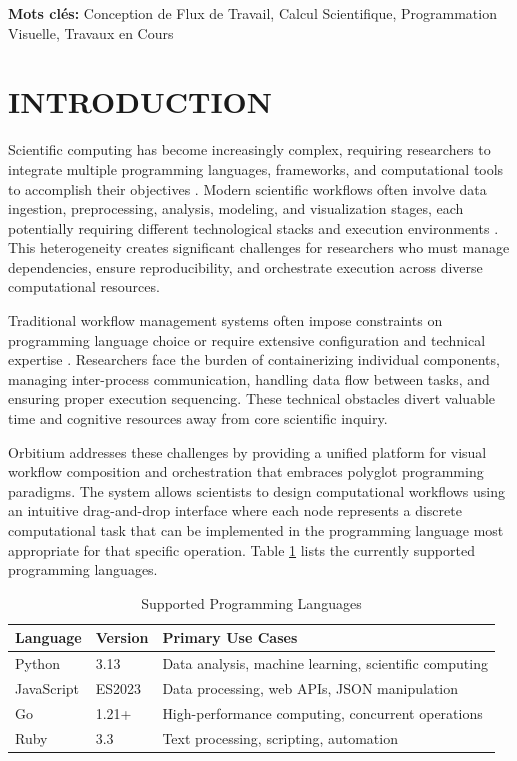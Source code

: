 \documentclass[12pt]{article}
\begin{document}
\vspace{1cm}

\noindent
\textbf{Mots clés:} Conception de Flux de Travail, Calcul Scientifique, Programmation Visuelle, Travaux en Cours

\newpage
\section{INTRODUCTION}

\hspace{\parindent}Scientific computing has become increasingly complex, requiring researchers to integrate multiple programming languages, frameworks, and computational tools to accomplish their objectives \cite{cohen2020scientific}. Modern scientific workflows often involve data ingestion, preprocessing, analysis, modeling, and visualization stages, each potentially requiring different technological stacks and execution environments \cite{deelman2015future}. This heterogeneity creates significant challenges for researchers who must manage dependencies, ensure reproducibility, and orchestrate execution across diverse computational resources.

\hspace{\parindent}Traditional workflow management systems often impose constraints on programming language choice or require extensive configuration and technical expertise \cite{amstutz2016common}. Researchers face the burden of containerizing individual components, managing inter-process communication, handling data flow between tasks, and ensuring proper execution sequencing. These technical obstacles divert valuable time and cognitive resources away from core scientific inquiry.

\hspace{\parindent}Orbitium addresses these challenges by providing a unified platform for visual workflow composition and orchestration that embraces polyglot programming paradigms. The system allows scientists to design computational workflows using an intuitive drag-and-drop interface where each node represents a discrete computational task that can be implemented in the programming language most appropriate for that specific operation. Table \ref{tab:languages} lists the currently supported programming languages.

\begin{table}[h]
\centering
\caption{Supported Programming Languages}
\label{tab:languages}
\begin{tabular}{|l|l|p{6cm}|}
\hline
\textbf{Language} & \textbf{Version} & \textbf{Primary Use Cases} \\
\hline
Python & 3.13 & Data analysis, machine learning, scientific computing \\
JavaScript & ES2023 & Data processing, web APIs, JSON manipulation \\
Go & 1.21+ & High-performance computing, concurrent operations \\
Ruby & 3.3 & Text processing, scripting, automation \\
\hline
\end{tabular}
\end{table}
\end{document}
